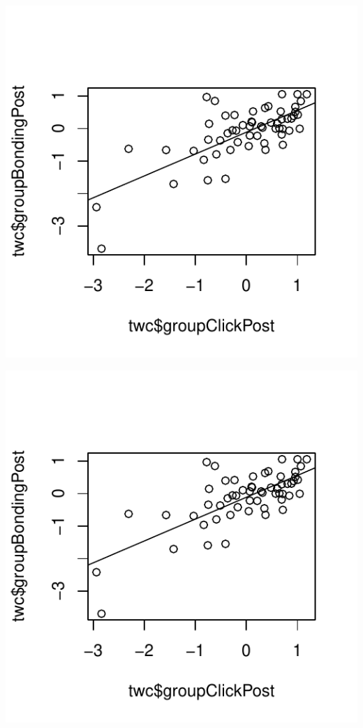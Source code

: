 \documentclass[english]{article}\usepackage[]{graphicx}\usepackage[]{color}
\makeatletter
\def\maxwidth{ %
  \ifdim\Gin@nat@width>\linewidth
    \linewidth
  \else
    \Gin@nat@width
  \fi
}
\newenvironment{knitrout}{}{} %
\makeatother
\begin{document}
\begin{knitrout}
{}




{\centering \includegraphics[width=\maxwidth]{figure/predictionsTest-3} 

}




{\centering \includegraphics[width=\maxwidth]{figure/predictionsTest-4} 

}



\end{knitrout}
\end{document}
